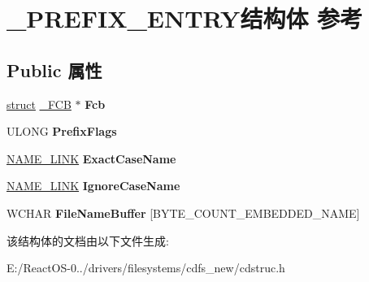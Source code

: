 \hypertarget{struct___p_r_e_f_i_x___e_n_t_r_y}{}\section{\+\_\+\+P\+R\+E\+F\+I\+X\+\_\+\+E\+N\+T\+R\+Y结构体 参考}
\label{struct___p_r_e_f_i_x___e_n_t_r_y}
\subsection*{Public 属性}
\begin{DoxyCompactItemize}
\item 
\mbox{\label{struct___p_r_e_f_i_x___e_n_t_r_y_a0891c2d4183b6754d329aeb55cb2b909}} 
\hyperlink{interfacestruct}{struct} \hyperlink{struct___f_c_b}{\+\_\+\+F\+CB} $\ast$ {\bfseries Fcb}
\item 
\mbox{\label{struct___p_r_e_f_i_x___e_n_t_r_y_a6bf99e7012505ad968849c0bdfc4fc77}} 
U\+L\+O\+NG {\bfseries Prefix\+Flags}
\item 
\mbox{\label{struct___p_r_e_f_i_x___e_n_t_r_y_aafc255d6d5c500cc414ae64583791765}} 
\hyperlink{struct___n_a_m_e___l_i_n_k}{N\+A\+M\+E\+\_\+\+L\+I\+NK} {\bfseries Exact\+Case\+Name}
\item 
\mbox{\label{struct___p_r_e_f_i_x___e_n_t_r_y_a8831d992f572a67f27f2ed1915109b38}} 
\hyperlink{struct___n_a_m_e___l_i_n_k}{N\+A\+M\+E\+\_\+\+L\+I\+NK} {\bfseries Ignore\+Case\+Name}
\item 
\mbox{\label{struct___p_r_e_f_i_x___e_n_t_r_y_ab000882e53a47e5e80e4f614634437a0}} 
W\+C\+H\+AR {\bfseries File\+Name\+Buffer} \mbox{[}B\+Y\+T\+E\+\_\+\+C\+O\+U\+N\+T\+\_\+\+E\+M\+B\+E\+D\+D\+E\+D\+\_\+\+N\+A\+ME\mbox{]}
\end{DoxyCompactItemize}


该结构体的文档由以下文件生成\+:\begin{DoxyCompactItemize}
\item 
E\+:/\+React\+O\+S-\/0../drivers/filesystems/cdfs\+\_\+new/cdstruc.\+h\end{DoxyCompactItemize}
